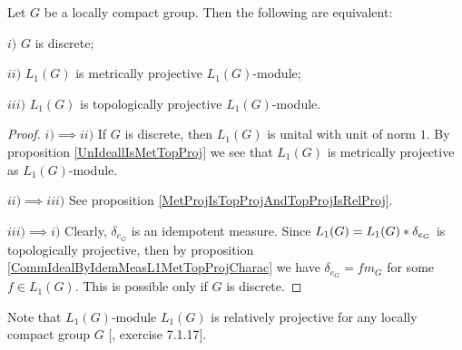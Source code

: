 \begin{theorem}\label{L1ModL1MetTopProjCharac} Let $G$ be a locally compact group. Then the following are equivalent:

$i)$ $G$ is discrete;

$ii)$ $L_1(G)$ is metrically projective $L_1(G)$-module;

$iii)$ $L_1(G)$ is topologically projective $L_1(G)$-module.
\end{theorem}
\begin{proof} $i)$$\implies$$ ii)$ If $G$ is discrete, then $L_1(G)$ is unital with unit of norm $1$. By  proposition \ref{UnIdeallIsMetTopProj} we see that $L_1(G)$ is metrically projective as $L_1(G)$-module.

$ii)$$\implies$$ iii)$ See proposition \ref{MetProjIsTopProjAndTopProjIsRelProj}.

$iii)$$ \implies$$ i)$ Clearly, $\delta_{e_G}$ is an idempotent measure. Since $L_1(G)=L_1(G)\ast \delta_{e_G}$ is topologically projective, then by proposition \ref{CommIdealByIdemMeasL1MetTopProjCharac} we have $\delta_{e_G}=f m_G$ for some $f\in L_1(G)$. This is possible only if $G$ is discrete.
\end{proof}

Note that $L_1(G)$-module $L_1(G)$ is relatively projective for any locally compact group $G$ [\cite{HelBanLocConvAlg}, exercise 7.1.17].

